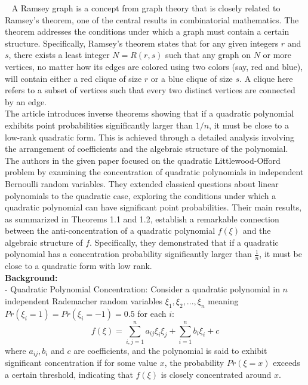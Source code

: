 

~\cite{kwan2019algebraic}
A Ramsey graph is a concept from graph theory that is closely related to Ramsey's theorem, one of the central results in combinatorial mathematics. The theorem addresses the conditions under which a graph must contain a certain structure. Specifically, Ramsey's theorem states that for any given integers ${r}$ and ${s}$, there exists a least integer ${N=R(r,s)}$ such that any graph on ${N}$ or more vertices, no matter how its edges are colored using two colors (say, red and blue), will contain either a red clique of size ${r}$ or a blue clique of size ${s}$. A clique here refers to a subset of vertices such that every two distinct vertices are connected by an edge.\\\newline
The article introduces inverse theorems showing that if a quadratic polynomial exhibits point probabilities significantly larger than ${1/n}$, it must be close to a low-rank quadratic form. This is achieved through a detailed analysis involving the arrangement of coefficients and the algebraic structure of the polynomial.\\\newline
The authors in the given paper focused on the quadratic Littlewood-Offord problem by examining the concentration of quadratic polynomials in independent Bernoulli random variables. They extended classical questions about linear polynomials to the quadratic case, exploring the conditions under which a quadratic polynomial can have significant point probabilities. Their main results, as summarized in Theorems 1.1 and 1.2, establish a remarkable connection between the anti-concentration of a quadratic polynomial $f(\xi)$ and the algebraic structure of $f$. Specifically, they demonstrated that if a quadratic polynomial has a concentration probability significantly larger than $\frac{1}{n}$, it must be close to a quadratic form with low rank.\\\newline
\textbf{Background:}\\
- Quadratic Polynomial Concentration: Consider a quadratic polynomial in ${n}$ independent Rademacher random variables ${\xi_1, \xi_2,...,\xi_n}$ meaning ${Pr(\xi_i=1)=Pr(\xi_i=-1)=0.5}$ for each ${i}$:
$${f(\xi)=\sum_{i,j=1}^{n} a_{ij} \xi_i \xi_j + \sum_{i=1}^{n} b_i \xi_i + c}$$
where ${a_{ij},b_i}$ and ${c}$ are coefficients, and the polynomial is said to exhibit significant concentration if for some value ${x}$, the probability ${Pr(\xi=x)}$ exceeds a certain threshold, indicating that ${f(\xi)}$ is closely concentrated around ${x}$.\\\newline
